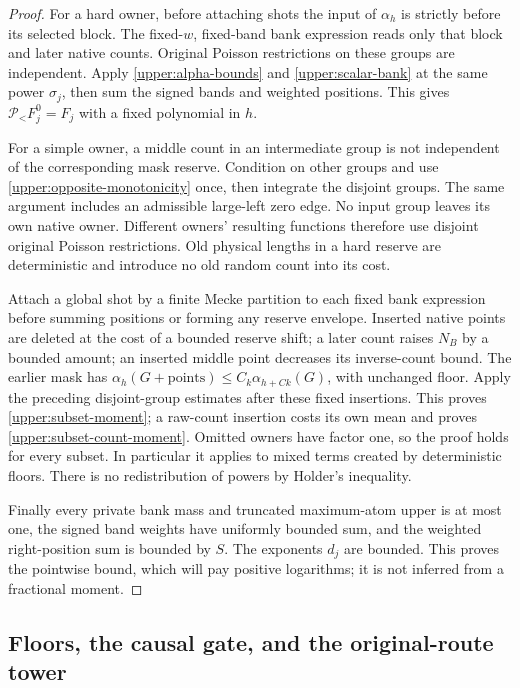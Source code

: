 \begin{proof}
For a hard owner, before attaching shots the input of $\alpha_h$ is
strictly before its selected block.  The fixed-$w$, fixed-band bank
expression reads only that block and later native counts.  Original
Poisson restrictions on these groups are independent.  Apply
\eqref{upper:alpha-bounds} and \eqref{upper:scalar-bank} at the same
power $\sigma_j$, then sum the signed bands and weighted positions.
This gives $\mathcal P_<F_j^0=F_j$ with a fixed polynomial in $h$.

For a simple owner, a middle count in an intermediate group is not
independent of the corresponding mask reserve.  Condition on other
groups and use \eqref{upper:opposite-monotonicity} once, then integrate
the disjoint groups.  The same argument includes an admissible
large-left zero edge.  No input group leaves its own native owner.
Different owners' resulting functions therefore use disjoint original
Poisson restrictions.  Old physical lengths in a hard reserve are
deterministic and introduce no old random count into its cost.

Attach a global shot by a finite Mecke partition to each fixed bank
expression before summing positions or forming any reserve envelope.
Inserted native points are deleted at the cost of a bounded reserve
shift; a later count raises $N_B$ by a bounded amount; an inserted
middle point decreases its inverse-count bound.  The earlier mask has
$\alpha_h(G+\text{points})\leq C_k\alpha_{h+Ck}(G)$, with unchanged
floor.  Apply the preceding disjoint-group estimates after these
fixed insertions.  This proves \eqref{upper:subset-moment}; a raw-count
insertion costs its own mean and proves \eqref{upper:subset-count-moment}.
Omitted owners have factor one, so the proof holds for every subset.
In particular it applies to mixed terms created by deterministic floors.
There is no redistribution of powers by Holder's inequality.

Finally every private bank mass and truncated maximum-atom upper is at
most one, the signed band weights have uniformly bounded sum, and the
weighted right-position sum is bounded by $S$.  The exponents $d_j$
are bounded.  This proves the pointwise bound, which will pay positive
logarithms; it is not inferred from a fractional moment.
\end{proof}

\subsection{Floors, the causal gate, and the original-route tower}
\label{upper:composition-section}

